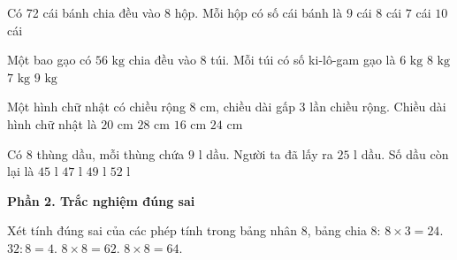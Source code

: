 \begin{ex} %
Có 72 cái bánh chia đều vào 8 hộp. Mỗi hộp có số cái bánh là
\choice
{\True $9$ cái}
{$8$ cái}
{$7$ cái}
{$10$ cái}
\end{ex}

\begin{ex} %
Một bao gạo có $56\text{ kg}$ chia đều vào 8 túi. Mỗi túi có số ki-lô-gam gạo là
\choice
{$6\text{ kg}$}
{$8\text{ kg}$}
{\True $7\text{ kg}$}
{$9\text{ kg}$}
\end{ex}

\begin{ex} %
Một hình chữ nhật có chiều rộng $8\text{ cm}$, chiều dài gấp 3 lần chiều rộng. Chiều dài hình chữ nhật là
\choice
{$20\text{ cm}$}
{$28\text{ cm}$}
{$16\text{ cm}$}
{\True $24\text{ cm}$}
\end{ex}

\begin{ex} %
Có 8 thùng dầu, mỗi thùng chứa $9\text{ l}$ dầu. Người ta đã lấy ra $25\text{ l}$ dầu. Số dầu còn lại là
\choice
{$45\text{ l}$}
{\True $47\text{ l}$}
{$49\text{ l}$}
{$52\text{ l}$}
\end{ex}

\textbf{Phần 2. Trắc nghiệm đúng sai}

\begin{ex} %
Xét tính đúng sai của các phép tính trong bảng nhân 8, bảng chia 8:
\choiceTF
{\True $8 \times 3 = 24$.}
{\True $32 : 8 = 4$.}
{$8 \times 8 = 62$.}
{\True $8 \times 8 = 64$.}
\end{ex}

